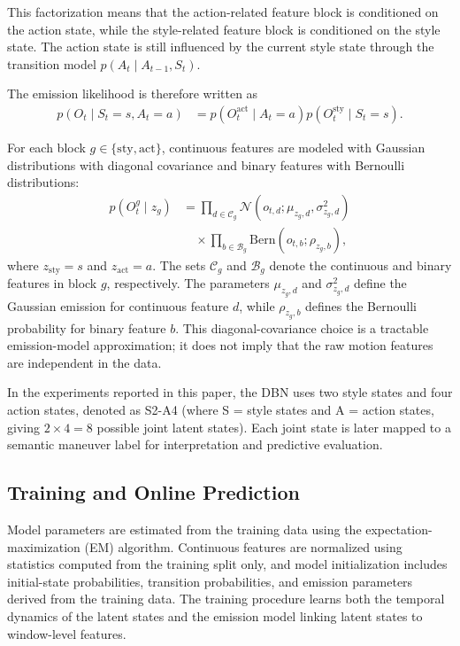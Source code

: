 \documentclass[upint,subscriptcorrection,varvw,hyphenate,balance,greek,russian,vietnamese,german]{asmeconf} %
\begin{document}
This factorization means that the action-related feature block is conditioned on the action state, while the style-related feature block is conditioned on the 
style state. 
The action state is still influenced by the current style state through the transition model $p(A_t \mid A_{t-1},S_t)$.

The emission likelihood is therefore written as 
\begin{equation}\label{eqn:tied_action_emission}
\begin{split}
p(O_t \mid S_t=s,A_t=a)
&=
p(O_t^{\mathrm{act}} \mid A_t=a)
p(O_t^{\mathrm{sty}} \mid S_t=s).
\end{split}
\end{equation}

For each block $g \in \{\mathrm{sty},\mathrm{act}\}$, continuous features are modeled with Gaussian distributions with diagonal covariance and binary features with 
Bernoulli distributions:
\begin{equation}\label{eqn:block_emission}
\begin{split}
p(O_t^{g} \mid z_g)
&=
\prod_{d \in \mathcal{C}_{g}}
\mathcal{N}\left(o_{t,d};\mu_{z_g,d},\sigma^2_{z_g,d}\right) \\
&\quad \times
\prod_{b \in \mathcal{B}_{g}}
\mathrm{Bern}\left(o_{t,b};\rho_{z_g,b}\right),
\end{split}
\end{equation}
where $z_{\mathrm{sty}}=s$ and $z_{\mathrm{act}}=a$. 
The sets $\mathcal{C}_{g}$ and $\mathcal{B}_{g}$ denote the continuous and binary features in block $g$, respectively. 
The parameters $\mu_{z_g,d}$ and $\sigma^2_{z_g,d}$ define the Gaussian emission for continuous feature $d$, while $\rho_{z_g,b}$ defines the 
Bernoulli probability for binary feature $b$. This diagonal-covariance choice is a tractable emission-model approximation; it does not imply that the raw motion features are independent in the data.

In the experiments reported in this paper, the DBN uses two style states and four action states, denoted as S2-A4 (where S = style states and A = action states, giving $2 \times 4 = 8$ possible joint latent states). 
Each joint state is later mapped to a semantic maneuver label for interpretation and predictive evaluation.

\subsection{Training and Online Prediction}
Model parameters are estimated from the training data using the expectation-maximization (EM) algorithm. 
Continuous features are normalized using statistics computed from the training split only, and model initialization includes initial-state probabilities, 
transition probabilities, and emission parameters derived from the training data. 
The training procedure learns both the temporal dynamics of the latent states and the emission model linking latent states to window-level features.
\end{document}
